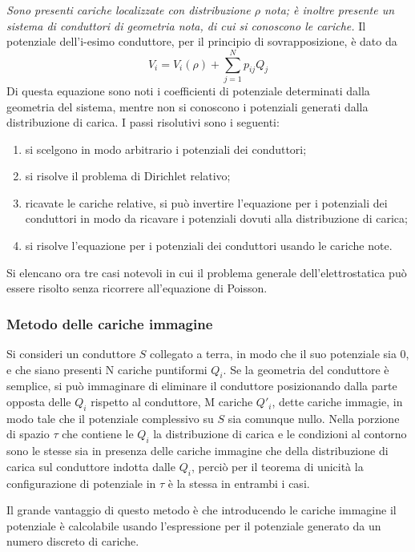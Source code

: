 \textit{Sono presenti cariche localizzate con distribuzione $\rho$ nota; è inoltre presente
un sistema di conduttori di geometria nota, di cui si conoscono le cariche.}
Il potenziale dell'i-esimo conduttore, per il principio di sovrapposizione, è dato da
\[
    V_i=V_i(\rho)+\sum_{j=1}^N p_{ij}Q_j
\]
Di questa equazione sono noti i coefficienti di potenziale determinati dalla geometria del
sistema, mentre non si conoscono i potenziali generati dalla distribuzione di carica.
I passi risolutivi sono i seguenti:
\begin{enumerate}
    \item si scelgono in modo arbitrario i potenziali dei conduttori;
    \item si risolve il problema di Dirichlet relativo;
    \item ricavate le cariche relative, si può invertire l'equazione per i potenziali dei conduttori
        in modo da ricavare i potenziali dovuti alla distribuzione di carica;
    \item si risolve l'equazione per i potenziali dei conduttori usando le cariche note.
\end{enumerate}

Si elencano ora tre casi notevoli in cui il problema generale dell'elettrostatica può
essere risolto senza ricorrere all'equazione di Poisson.

\subsubsection{Metodo delle cariche immagine}
Si consideri un conduttore $S$ collegato a terra, in modo che il suo potenziale sia 0, e che siano presenti
N cariche puntiformi $Q_i$. Se la geometria del conduttore è semplice, si può immaginare di eliminare il
conduttore posizionando dalla parte opposta delle $Q_i$ rispetto al conduttore, M cariche $Q'_i$, dette cariche immagie, in modo tale
che il potenziale complessivo su $S$ sia
comunque nullo. Nella porzione di spazio $\tau$ che contiene le $Q_i$ la distribuzione di carica e le condizioni
al contorno sono le stesse sia in presenza delle cariche immagine che della distribuzione di carica sul conduttore
indotta dalle $Q_i$, perciò per il
teorema di unicità la configurazione di potenziale in $\tau$ è la stessa in entrambi i casi.

Il grande vantaggio di questo metodo è che introducendo le cariche immagine il potenziale è calcolabile usando
l'espressione per il potenziale generato da un numero discreto di cariche.

